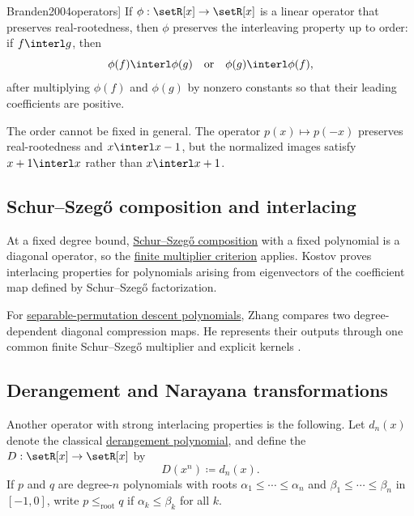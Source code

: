 \begin{theorem}[See \cite[Thm.~9]{Branden2004operators}]
\label{operatorPreservesInterlacing}
If $\phi : \setR[x] \to \setR[x]$ is a linear operator that preserves
real-rootedness, then $\phi$ preserves the interleaving property up to order:
if $f \interl g$, then
\[
  \phi(f) \interl \phi(g) \quad\text{or}\quad \phi(g) \interl \phi(f),
\]
after multiplying $\phi(f)$ and $\phi(g)$ by nonzero constants so that their
leading coefficients are positive.
\end{theorem}
The order cannot be fixed in general.  The operator $p(x)\mapsto p(-x)$
preserves real-rootedness and $x \interl x-1$, but the normalized images
satisfy $x+1 \interl x$ rather than $x \interl x+1$.





\subsection[schurSzegoInterlacing]{Schur--Szeg\H{o} composition and interlacing}

At a fixed degree bound, \hyperref[schurSzegoComposition]{Schur--Szeg\H{o}
composition} with a fixed polynomial is a diagonal operator, so the
\hyperref[finiteMultiplierSequenceCriterion]{finite multiplier criterion}
applies.  Kostov \cite{Kostov2010} proves interlacing properties for
polynomials arising from eigenvectors of the coefficient map defined by
Schur--Szeg\H{o} factorization.

For \hyperref[separableDescentRealRooted]{separable-permutation descent
polynomials}, Zhang compares two degree-dependent diagonal compression maps.
He represents their outputs through one common finite Schur--Szeg\H{o}
multiplier and explicit kernels
\cite[Thm.~4.1 and Lem.~4.2]{Zhang2026SeparableInterlacing}.

\subsection[derangedMap]{Derangement and Narayana transformations}

Another operator with strong interlacing properties is the following.
Let $d_n(x)$ denote the classical
\hyperref[peakRunDerangementPolynomials]{derangement polynomial}, and define
the \label{derangementTransformation}
$D : \setR[x] \to \setR[x]$ by
\[
 D(x^n) \coloneqq d_n(x).
\]
If $p$ and $q$ are degree-$n$ polynomials with roots
$\alpha_1 \leq \dotsb \leq \alpha_n$ and $\beta_1 \leq \dotsb \leq \beta_n$
in $[-1,0]$, write
\label{rootOrder} $p \leq_{\mathrm{root}} q$ if
$\alpha_k \leq \beta_k$ for all $k$.

